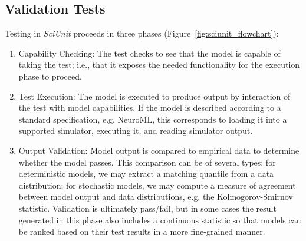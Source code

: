 \documentclass[11pt,letterpaper]{article}
\begin{document}
\subsection{Validation Tests}\label{sec:validation_tests} 
Testing  in \textit{SciUnit} proceeds in three phases (Figure~\ref{fig:sciunit_flowchart}): 
\begin{enumerate}
\item Capability Checking: The test checks to see that the model is capable of taking the test; i.e., that it exposes the needed functionality for the execution phase to proceed.
\item Test Execution: The model is executed to produce output by interaction of the test with model capabilities.  If the model is described according to a standard specification, e.g. NeuroML, this corresponds to loading it into a supported simulator, executing it, and reading simulator output. 
\item Output Validation: Model output is compared to empirical data to determine whether the model passes.  This comparison can be of several types: for deterministic models, we may extract a matching quantile from a data distribution; for stochastic models, we may compute a measure of agreement between model output and data distributions, e.g. the Kolmogorov-Smirnov statistic.  Validation is ultimately pass/fail, but in some cases the result generated in this phase also includes a continuous statistic so that models can be ranked based on their test results in a more fine-grained manner.   
\end{enumerate}
\end{document}
